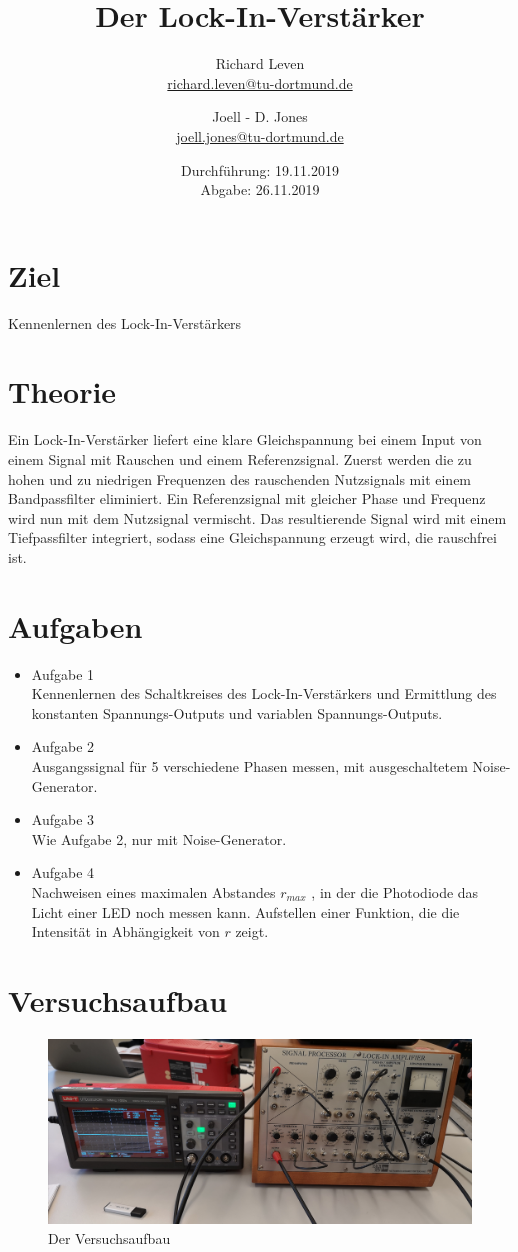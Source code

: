 \documentclass[captions=tableheading]{scrartcl}
\title{Der Lock-In-Verstärker}
\author{Richard Leven \\ \href{mailto:richard.leven@tu-dortmund.de}{richard.leven@tu-dortmund.de}
 \and Joell - D. Jones \\ \href{mailto:joell.jones@tu-dortmund.de}{joell.jones@tu-dortmund.de}}
\date{
    Durchführung: 19.11.2019\\
    Abgabe: 26.11.2019
}
\begin{document}
\maketitle
\newpage
\section{Ziel}
Kennenlernen des Lock-In-Verstärkers
\section{Theorie}
Ein Lock-In-Verstärker liefert eine klare Gleichspannung bei einem Input von einem Signal mit Rauschen und einem Referenzsignal.
Zuerst werden die zu hohen und zu niedrigen Frequenzen des rauschenden Nutzsignals mit einem Bandpassfilter eliminiert.
Ein Referenzsignal mit gleicher Phase und Frequenz wird nun mit dem Nutzsignal vermischt.
Das resultierende Signal wird mit einem Tiefpassfilter integriert, sodass eine Gleichspannung erzeugt wird, die rauschfrei ist.
\section{Aufgaben}
    \begin{itemize}
        \item{Aufgabe 1 \\}
        Kennenlernen des Schaltkreises des Lock-In-Verstärkers und Ermittlung des konstanten Spannungs-Outputs und variablen Spannungs-Outputs.
        \item{Aufgabe 2 \\}
        Ausgangssignal für 5 verschiedene Phasen messen, mit ausgeschaltetem Noise-Generator.
        \item{Aufgabe 3 \\}
        Wie Aufgabe 2, nur mit Noise-Generator.
        \item{Aufgabe 4 \\}
        Nachweisen eines maximalen Abstandes \(r_{max}\) , in der die Photodiode das Licht einer LED noch messen kann.
        Aufstellen einer Funktion, die die Intensität in Abhängigkeit von \(r\) zeigt.
    \end{itemize}
\section{Versuchsaufbau}

\begin{figure}
\centering
\includegraphics[scale=0.07]{Lock_In Bilder/Versauf.jpg}
\caption{Der Versuchsaufbau}
\label{fig:versau}
\end{figure}
\newpage
\end{document}
